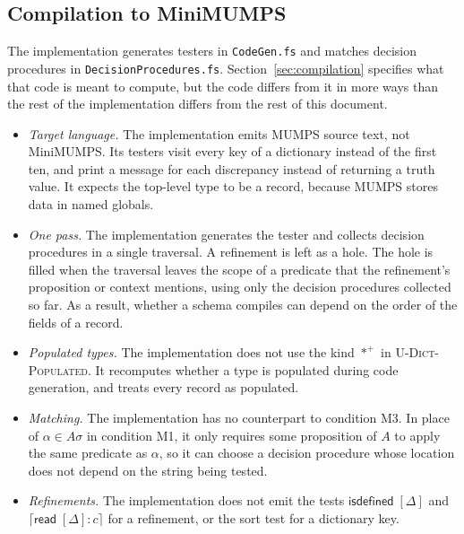 \documentclass[11pt]{article}
\newcommand{\kw}[1]{\mathsf{#1}}
\newcommand{\populated}{\ast^{+}}
\newcommand{\rulename}[1]{\textsc{#1}}
\newcommand{\isdef}[1]{\kw{isdefined}\;#1}
\newcommand{\readm}[1]{\kw{read}\;#1}
\newcommand{\sorttest}[2]{\lceil #1 : #2 \rceil}
\newcommand{\code}[1]{\texttt{#1}}
\theoremstyle{remark}
\begin{document}
\subsection{Compilation to MiniMUMPS}

The implementation generates testers in \code{CodeGen.fs} and matches decision procedures in
\code{DecisionProcedures.fs}. Section~\ref{sec:compilation} specifies what that code is meant to
compute, but the code differs from it in more ways than the rest of the implementation differs
from the rest of this document.
\begin{itemize}
\item \emph{Target language.} The implementation emits MUMPS source text, not MiniMUMPS. Its
  testers visit every key of a dictionary instead of the first ten, and print a message for each
  discrepancy instead of returning a truth value. It expects the top-level type to be a record,
  because MUMPS stores data in named globals.
\item \emph{One pass.} The implementation generates the tester and collects decision procedures in
  a single traversal. A refinement is left as a hole. The hole is filled when the traversal
  leaves the scope of a predicate that the refinement's proposition or context mentions, using
  only the decision procedures collected so far. As a result, whether a schema compiles can depend
  on the order of the fields of a record.
\item \emph{Populated types.} The implementation does not use the kind $\populated$ in
  \rulename{U-Dict-Populated}. It recomputes whether a type is populated during code generation,
  and treats every record as populated.
\item \emph{Matching.} The implementation has no counterpart to condition M3. In place of
  $\alpha \in A\sigma$ in condition M1, it only requires some proposition of $A$ to apply the same
  predicate as $\alpha$, so it can choose a decision procedure whose location does not depend on
  the string being tested.
\item \emph{Refinements.} The implementation does not emit the tests $\isdef{[\Delta]}$ and
  $\sorttest{\readm{[\Delta]}}{c}$ for a refinement, or the sort test for a dictionary key.
\end{itemize}
\end{document}
